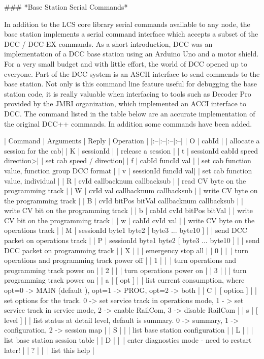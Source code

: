 ### *Base Station Serial Commands*

In addition to the LCS core library serial commands available to any node, the base station implements a serial command interface which accepts a subset of the DCC\+\+ / DCC-EX commands. As a short introduction, DCC\+\+ was an implementation of a DCC base station using an Arduino Uno and a motor shield. For a very small budget and with little effort, the world of DCC opened up to everyone. Part of the DCC\+\+ system is an ASCII interface to send commends to the base station. Not only is this command line feature useful for debugging the base station code, it is really valuable when interfacing to tools such as Decoder Pro provided by the JMRI organization, which implemented an ACCI interface to DCC\+\+. The command listed in the table below are an accurate implementation of the original DCC++ commands. In addition some commands have been added.

| Command | Arguments | Reply | Operation |
|:--|:--|:--|:--|
| O | cabId | | allocate a session for the cab|
| K | sessionId | | release a session |
| t | sessionId cabId speed direction>| | set cab speed / direction|
| f | cabId funcId val | | set cab function value, function group DCC format |
| v | sessionId funcId val| | set cab function value, individual |
| R | cvId callbacknum callbacksub | | read CV byte on the programming track |
| W | cvId val callbacknum callbacksub | | write CV byte on the programming track |
| B | cvId bitPos bitVal callbacknum callbacksub | | write CV bit on the programming track |
| b | cabId cvId bitPos bitVal | | write CV bit on the programming track |
| w | cabId cvId val | | write CV byte on the operations track |
| M | sessionId byte1 byte2 [ byte3 ... byte10 ] | | send DCC packet on operations track |
| P | sessionId byte1 byte2 [ byte3 ... byte10 ] | | send DCC packet on programming track |
| X | | | emergency stop all |
| 0 | | | turn operations and programming track power off |
| 1 | | | turn operations and programming track power on |
| 2 | | | turn operations power on |
| 3 | | | turn programming track power on |
| a | [ opt ] | | list current consumption, where opt=0 -> MAIN (default ), opt=1 -> PROG, opt=2 -> both |
| C | [ option ] | | set options for the track. 0 -> set service track in operations mode, 1 - > set service track in service mode, 2 -> enable RailCom, 3 -> disable RailCom |
| s | [ level ] | | list status at detail level, default is summary. 0 -> summary, 1 -> configuration,  2 -> session map |
| S | | | list base station configuration |
| L | | | list base station session table |
| D | | | enter diagnostics mode - need to restart later! |
| ? | | | list this help |

